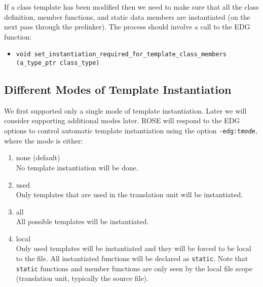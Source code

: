 \begin{enumerate}
\begin{itemize}
                     If a class template has been modified then we need to make sure that all the 
                     class definition,
                     member functions, and 
                     static data members
                     are instantiated (on the next pass through the prelinker). The process should 
                     involve a call to the EDG function:
                     \begin{itemize}
                          \item {\tt void set\_instantiation\_required\_for\_template\_class\_members (a\_type\_ptr class\_type)}
                     \end{itemize}

          \end{itemize}
\end{enumerate}

\subsection{Different Modes of Template Instantiation}
   
    We first supported only a single mode of template instantiation. Later we will
consider supporting additional modes later.
ROSE will respond to the EDG options to control automatic template instantiation using the
option {\tt -edg:t{\it mode}},
where the mode is either:
\begin{enumerate}
   \item none (default) \\
         No template instantiation will be done.
   \item used \\
         Only templates that are used in the translation unit will be instantiated.
   \item all \\
         All possible templates will be instantiated.
   \item local \\
         Only used templates will be instantiated and they will be forced to be local to
         the file.  All instantiated functions will be declared as {\tt static}.  Note that
         {\tt static} functions and member functions are only seen by the local file scope
         (translation unit, typically the source file).
\end{enumerate}


